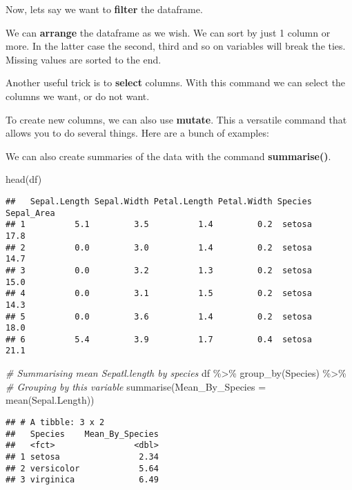 \documentclass[
]{book}
\newenvironment{Shaded}{\begin{snugshade}}{\end{snugshade}}
\newcommand{\AttributeTok}[1]{\textcolor[rgb]{0.77,0.63,0.00}{#1}}
\newcommand{\CommentTok}[1]{\textcolor[rgb]{0.56,0.35,0.01}{\textit{#1}}}
\newcommand{\FunctionTok}[1]{\textcolor[rgb]{0.00,0.00,0.00}{#1}}
\newcommand{\NormalTok}[1]{#1}
\newcommand{\SpecialCharTok}[1]{\textcolor[rgb]{0.00,0.00,0.00}{#1}}
\begin{document}
Now, lets say we want to \textbf{filter} the dataframe.

We can \textbf{arrange} the dataframe as we wish.
We can sort by just 1 column or more. In the latter case the second, third and so on variables will break the ties.
Missing values are sorted to the end.

Another useful trick is to \textbf{select} columns.
With this command we can select the columns we want, or do not want.

To create new columns, we can also use \textbf{mutate}. This a versatile command that allows you to do several things.
Here are a bunch of examples:

We can also create summaries of the data with the command \textbf{summarise()}.

\begin{Shaded}
\begin{Highlighting}[]
\FunctionTok{head}\NormalTok{(df)}
\end{Highlighting}
\end{Shaded}

\begin{verbatim}
##   Sepal.Length Sepal.Width Petal.Length Petal.Width Species Sepal_Area
## 1          5.1         3.5          1.4         0.2  setosa       17.8
## 2          0.0         3.0          1.4         0.2  setosa       14.7
## 3          0.0         3.2          1.3         0.2  setosa       15.0
## 4          0.0         3.1          1.5         0.2  setosa       14.3
## 5          0.0         3.6          1.4         0.2  setosa       18.0
## 6          5.4         3.9          1.7         0.4  setosa       21.1
\end{verbatim}

\begin{Shaded}
\begin{Highlighting}[]
\CommentTok{\# Summarising mean Sepatl.length by species}
\NormalTok{df }\SpecialCharTok{\%\textgreater{}\%} 
  \FunctionTok{group\_by}\NormalTok{(Species) }\SpecialCharTok{\%\textgreater{}\%}  \CommentTok{\# Grouping by this variable}
  \FunctionTok{summarise}\NormalTok{(}\AttributeTok{Mean\_By\_Species =} \FunctionTok{mean}\NormalTok{(Sepal.Length))}
\end{Highlighting}
\end{Shaded}

\begin{verbatim}
## # A tibble: 3 x 2
##   Species    Mean_By_Species
##   <fct>                <dbl>
## 1 setosa                2.34
## 2 versicolor            5.64
## 3 virginica             6.49
\end{verbatim}
\end{document}
